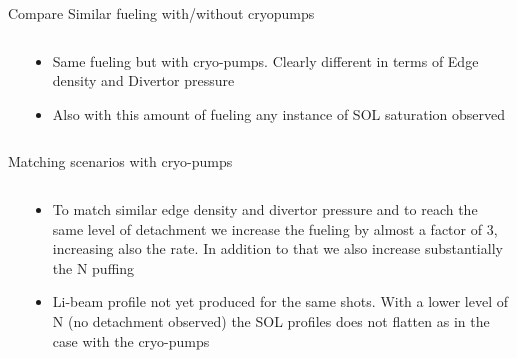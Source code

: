 \documentclass[10pt, compress]{beamer}
\newcommand\Fontvi{\fontsize{8}{7.2}\selectfont}
\begin{document}
\begin{frame}{Compare Similar fueling with/without cryopumps}
\Fontvi
  \vspace{-1cm}
\begin{columns}
  \begin{column}{0.65\textwidth}
  \end{column}
  \begin{column}{0.35\textwidth}
    \begin{itemize}
      \item<1-> Same fueling but with cryo-pumps. Clearly different in
        terms of Edge density and Divertor pressure
      \item<2-> Also with this amount of fueling any instance of SOL
        saturation observed
    \end{itemize}
  
  \end{column}
\end{columns}
\end{frame}

\begin{frame}{Matching scenarios with cryo-pumps}
\Fontvi
  \vspace{-1cm}
\begin{columns}
  \begin{column}{0.65\textwidth}
  \end{column}
  \begin{column}{0.35\textwidth}
    \begin{itemize}
      \item<1-> To match similar edge density and divertor pressure
        and to reach the same level of detachment we increase the
        fueling by almost a factor of 3, increasing also the rate. In
        addition to that we also increase substantially the N puffing
      \item<2-> Li-beam profile not yet produced for the same
        shots. With a lower level of N (no detachment observed) the
        SOL profiles does not flatten as in the case with the cryo-pumps
    \end{itemize}
  \end{column}
\end{columns}
\end{frame}
\end{document}
